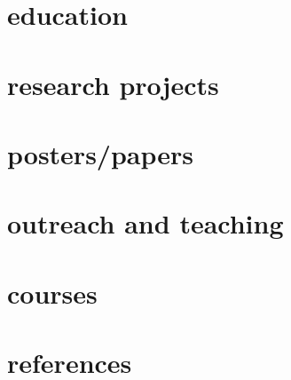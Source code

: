 \documentclass[10pt, a4paper]{extarticle}
\begin{document}
    
    

    \section{\textbf{\textcolor{headorange}{education}}}
    

    \section{\textbf{\textcolor{headgreen}{research projects}}}
    

    \section{\textbf{\textcolor{headmint}{posters/papers}}}
    

    \section{\textbf{\textcolor{headblue}{outreach and teaching}}}
    
    
    \section{\textbf{\textcolor{headred}{courses}}}
    

    \section{\textbf{\textcolor{headviol}{references}}}
    
\end{document}
